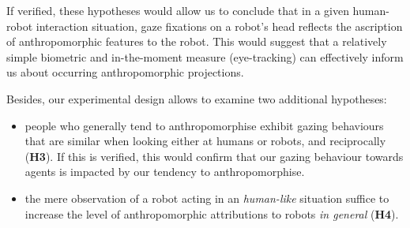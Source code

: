 \documentclass[lettersize, noapacite, twoside, HRI]{apa_HRI}
\newcommand{\h}[1]{\textbf{H#1}\xspace}
\begin{document}
If verified, these hypotheses would allow us to conclude that in a given
human-robot interaction situation, gaze fixations on a robot's head reflects the
ascription of anthropomorphic features to the robot. This would suggest that a
relatively simple biometric and in-the-moment measure (eye-tracking) can
effectively inform us about occurring anthropomorphic projections.


\vspace{1em}

Besides, our experimental design allows to examine two additional hypotheses:

\begin{itemize}
    \item people who generally tend to anthropomorphise exhibit gazing
        behaviours that are similar when looking either at humans or robots, and
        reciprocally (\h{3}). If this is verified, this would confirm that our
        gazing behaviour towards agents is impacted by our tendency to
        anthropomorphise.

    \item the mere observation of a robot acting in an \emph{human-like}
        situation suffice to increase the level of
        anthropomorphic attributions to robots \emph{in general} (\h{4}).
\end{itemize}

\end{document}
